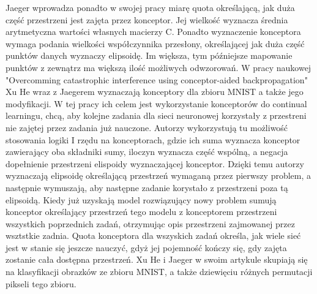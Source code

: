 \documentclass{article}
\begin{document}
\par
Jaeger wprowadza ponadto w swojej pracy miarę quota określającą, jak duża część przestrzeni jest zajęta przez konceptor. Jej wielkość wyznacza średnia arytmetyczna wartości własnych macierzy C. Ponadto wyznaczenie konceptora wymaga podania wielkości współczynnika przesłony, określającej jak duża część punktów danych wyznaczy elipsoidę. Im większa, tym późniejsze mapowanie punktów z zewnątrz ma większą ilość możliwych odwzorowań. W pracy naukowej "Overcomming catastrophic interference using conceptor-aided backpropagation" Xu He wraz z Jaegerem wyznaczają konceptory dla zbioru MNIST a także jego modyfikacji. W tej pracy ich celem jest wykorzystanie konceptorów do continual learningu, chcą, aby kolejne zadania dla sieci neuronowej korzystały z przestreni nie zajętej przez zadania już nauczone. Autorzy wykorzystują tu możliwość stosowania logiki I rzędu na konceptorach, gdzie ich suma wyznacza konceptor zawierający oba składniki sumy, iloczyn wyznacza część wspólną, a negacja dopełnienie przestrzeni elispoidy wyznaczającej konceptor. Dzięki temu autorzy wyznaczają elipsoidę określającą przestrzeń wymaganą przez pierwszy problem, a następnie wymuszają, aby następne zadanie korystało z przestrzeni poza tą elipsoidą. Kiedy już uzyskają model rozwiązujący nowy problem sumują konceptor określający przestrzeń tego modelu z konceptorem przestrzeni wszystkich poprzednich zadań, otrzymując opis przestrzeni zajmowanej przez wsztstkie zadnia. Quota konceptora dla wszyskich zadań określa, jak wiele sieć jest w stanie się jeszcze nauczyć, gdyż jej pojemność kończy się, gdy zajęta zostanie cała dostępna przestrzeń. Xu He i Jaeger w swoim artykule skupiają się na klasyfikacji obrazków ze zbioru MNIST, a także dziewięciu różnych permutacji pikseli tego zbioru. 
\par
\end{document}
